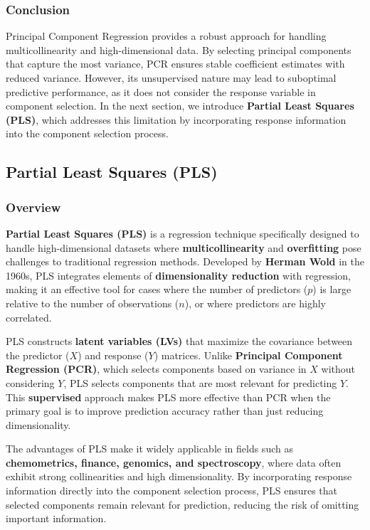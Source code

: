 \documentclass[11pt,twoside,a4paper]{article}
\begin{document}
\subsubsection{Conclusion}
Principal Component Regression provides a robust approach for handling multicollinearity and high-dimensional data. By selecting principal components that capture the most variance, PCR ensures stable coefficient estimates with reduced variance. However, its unsupervised nature may lead to suboptimal predictive performance, as it does not consider the response variable in component selection. In the next section, we introduce \textbf{Partial Least Squares (PLS)}, which addresses this limitation by incorporating response information into the component selection process.

\subsection{Partial Least Squares (PLS)}

\subsubsection{Overview}
\textbf{Partial Least Squares (PLS)} is a regression technique specifically designed to handle high-dimensional datasets where \textbf{multicollinearity} and \textbf{overfitting} pose challenges to traditional regression methods. Developed by \textbf{Herman Wold} in the 1960s, PLS integrates elements of \textbf{dimensionality reduction} with regression, making it an effective tool for cases where the number of predictors (\( p \)) is large relative to the number of observations (\( n \)), or where predictors are highly correlated.

PLS constructs \textbf{latent variables (LVs)} that maximize the covariance between the predictor (\(X\)) and response (\(Y\)) matrices. Unlike \textbf{Principal Component Regression (PCR)}, which selects components based on variance in \( X \) without considering \( Y \), PLS selects components that are most relevant for predicting \( Y \). This \textbf{supervised} approach makes PLS more effective than PCR when the primary goal is to improve prediction accuracy rather than just reducing dimensionality.

The advantages of PLS make it widely applicable in fields such as \textbf{chemometrics, finance, genomics, and spectroscopy}, where data often exhibit strong collinearities and high dimensionality. By incorporating response information directly into the component selection process, PLS ensures that selected components remain relevant for prediction, reducing the risk of omitting important information.
\end{document}
